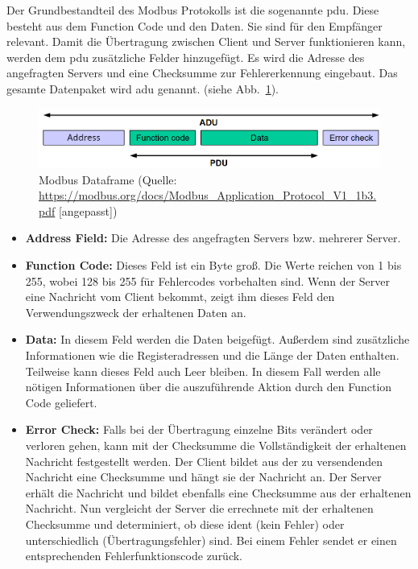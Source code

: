 Der Grundbestandteil des Modbus Protokolls ist die sogenannte \acf{pdu}. Diese besteht aus dem Function Code und den Daten. Sie sind für den Empfänger relevant. Damit die Übertragung zwischen Client und Server funktionieren kann, werden dem \acs{pdu} zusätzliche Felder hinzugefügt. Es wird die Adresse des angefragten Servers und eine Checksumme zur Fehlererkennung eingebaut. Das gesamte Datenpaket wird \acf{adu} genannt.
(siehe Abb.~\ref{fig:modbus_adu_pdu}).
\begin{figure}[ht]
	\centering
	\includegraphics[width=1.0\linewidth]{Bilder/General_Modbus_Frame_Changed}
	\caption{Modbus Dataframe (Quelle: \url{https://modbus.org/docs/Modbus_Application_Protocol_V1_1b3.pdf} [angepasst])}
	\label{fig:modbus_adu_pdu}
\end{figure}

\begin{itemize}
	\item \textbf{Address Field:} Die Adresse des angefragten Servers bzw. mehrerer Server.
	\item \textbf{Function Code:} Dieses Feld ist ein Byte groß. Die Werte reichen von 1 bis 255, wobei 128 bis 255 für Fehlercodes vorbehalten sind. Wenn der Server eine Nachricht vom Client bekommt, zeigt ihm dieses Feld den Verwendungszweck der erhaltenen Daten an. 
	\item \textbf{Data:} In diesem Feld werden die Daten beigefügt. Außerdem sind zusätzliche Informationen wie die Registeradressen und die Länge der Daten enthalten. Teilweise kann dieses Feld auch Leer bleiben. In diesem Fall werden alle nötigen Informationen über die auszuführende Aktion durch den Function Code geliefert.
	\item \textbf{Error Check:} Falls bei der Übertragung einzelne Bits verändert oder verloren gehen, kann mit der Checksumme die Vollständigkeit der erhaltenen Nachricht festgestellt werden. Der Client bildet aus der zu versendenden Nachricht eine Checksumme und hängt sie der Nachricht an. Der Server erhält die Nachricht und bildet ebenfalls eine Checksumme aus der erhaltenen Nachricht. Nun vergleicht der Server die errechnete mit der erhaltenen Checksumme und determiniert, ob diese ident (kein Fehler) oder unterschiedlich (Übertragungsfehler) sind. Bei einem Fehler sendet er einen entsprechenden Fehlerfunktionscode zurück.
\end{itemize}

